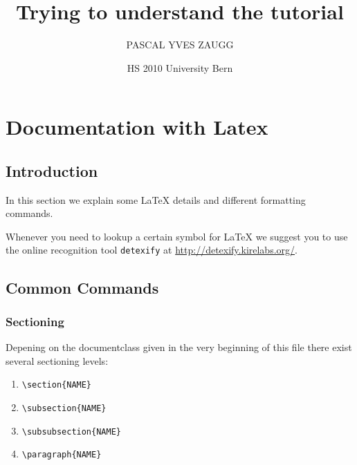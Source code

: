 \documentclass[10pt,a4paper]{scrartcl}
\date{HS 2010 University Bern}
\author{PASCAL YVES ZAUGG}
\title{Trying to understand the tutorial}
\begin{document}
\maketitle

\tableofcontents

\newpage
\section{Documentation with Latex}
\subsection{Introduction} 

In this section we explain some \LaTeX\xspace details and different formatting
commands.

Whenever you need to lookup a certain symbol for \LaTeX\xspace we suggest you
to use the online recognition tool \texttt{detexify} at
\url{http://detexify.kirelabs.org/}.


\subsection{Common Commands}
\subsubsection{Sectioning}
Depening on the documentclass given in the very beginning of this file there
exist several sectioning levels:
\begin{enumerate}
\item{} \verb$\section{NAME}$
\item{} \verb$\subsection{NAME}$
\item{} \verb$\subsubsection{NAME}$
\item{} \verb$\paragraph{NAME}$
\end{enumerate}
\end{document}
